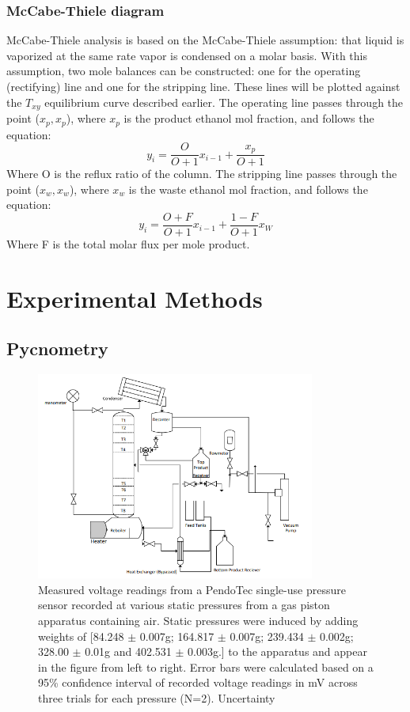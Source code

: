 \documentclass[lettersize,journal]{IEEEtran}
\begin{document}
	\subsubsection{McCabe-Thiele diagram}
	McCabe-Thiele analysis is based on the McCabe-Thiele assumption: that liquid is vaporized at the same rate vapor is condensed on a molar basis. With this assumption, two mole balances can be constructed: one for the operating (rectifying) line and one for the stripping line. These lines will be plotted against the $T_{xy}$ equilibrium curve described earlier. The operating line passes through the point ($x_{p},x_{p}$), where $x_{p}$ is the product ethanol mol fraction, and follows the equation:
	\begin{equation}
		\label{deqn_ex5.5}
		y_{i} = \frac{O}{O+1}x_{i-1} + \frac{x_{p}}{O+1}
	\end{equation}
	Where O is the reflux ratio of the column. The stripping line passes through the point ($x_{w},x_{w}$), where $x_{w}$ is the waste ethanol mol fraction, and follows the equation:
	\begin{equation}
		\label{deqn_ex5.5}
		y_{i} = \frac{O+F}{O+1}x_{i-1} + \frac{1-F}{O+1}x_{W}
	\end{equation}
	Where F is the total molar flux per mole product.
	
	
	
	
	\section{Experimental Methods}
	\subsection{Pycnometry}
	\begin{figure}[!t]
		\centering
		\includegraphics[width=3.6in]{Drawing}
		\caption{Measured voltage readings from a PendoTec single-use pressure sensor recorded at various static pressures from a gas piston apparatus containing air. Static pressures were induced by adding weights of [84.248 $\pm$ 0.007g; 164.817 $\pm$ 0.007g; 239.434 $\pm$ 0.002g; 328.00 $\pm$ 0.01g and 402.531 $\pm$ 0.003g.] to the apparatus and appear in the figure from left to right. Error bars were calculated based on a 95\% confidence interval of recorded voltage readings in mV across three trials for each pressure (N=2). Uncertainty }
		\label{fig_2}
	\end{figure}
\end{document}
